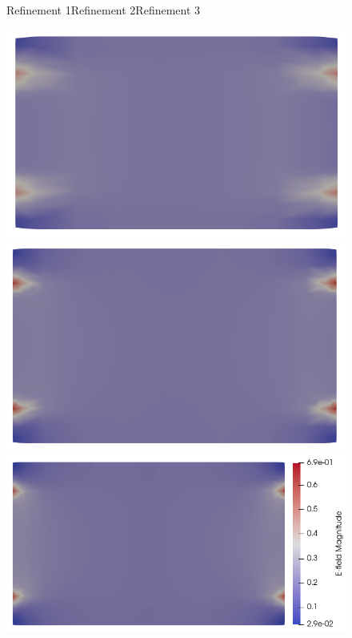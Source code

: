 \documentclass{report}
\begin{document}
\begin{figure}
    \centering
    Refinement 1\hspace{2.5cm}Refinement 2\hspace{2.5cm}Refinement 3\hspace{1cm}
    
    \includegraphics[scale=0.27]{slice_E_T-1_lambda-0_8-2-2.png}
    \includegraphics[scale=0.27]{slice_E_T-1_lambda-0_16-3-3.png}
    \includegraphics[scale=0.27]{slice_E_T-1_lambda-0_32-3-4.png}

\end{figure}
\end{document}
